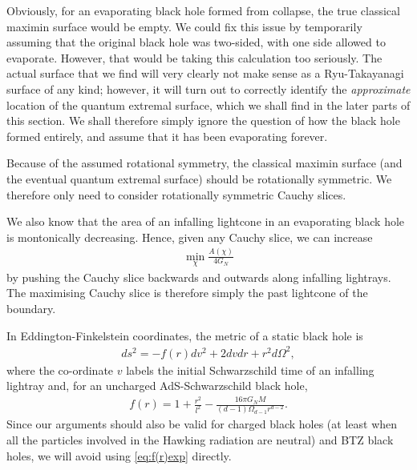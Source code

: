 \documentclass[12pt]{article}
\begin{document}
Obviously, for an evaporating black hole formed from collapse, the true classical maximin surface would be empty. We could fix this issue by temporarily assuming that the original black hole was two-sided, with one side allowed to evaporate. However, that would be taking this calculation too seriously. The actual surface that we find will very clearly not make sense as a Ryu-Takayanagi surface of any kind; however, it will turn out to correctly identify the \emph{approximate} location of the quantum extremal surface, which we shall find in the later parts of this section. We shall therefore simply ignore the question of how the black hole formed entirely, and assume that it has been evaporating forever.

Because of the assumed rotational symmetry, the classical maximin surface (and the eventual quantum extremal surface) should be rotationally symmetric. We therefore only need to consider rotationally symmetric Cauchy slices. 

We also know that the area of an infalling lightcone in an evaporating black hole is montonically decreasing. Hence, given any Cauchy slice, we can increase
\begin{align}
 \min_{\chi} \frac{A(\chi)}{4 G_N} 
\end{align}
by pushing the Cauchy slice backwards and outwards along infalling lightrays. The maximising Cauchy slice is therefore simply the past lightcone of the boundary.

In Eddington-Finkelstein coordinates, the metric of a static black hole is
\begin{align} \label{eq:staticmetric}
ds^2 = -f(r) dv^2 + 2 dv dr + r^2 d\Omega^2,
\end{align}
where the co-ordinate $v$ labels the initial Schwarzschild time of an infalling lightray and, for an uncharged AdS-Schwarzschild black hole, 
\begin{align} \label{eq:f(r)exp}
f(r) = 1 + \frac{r^2}{l^2} - \frac{16 \pi G_N M}{(d-1)\Omega_{d-1} r^{d-2}}.
\end{align}
Since our arguments should also be valid for charged black holes (at least when all the particles involved in the Hawking radiation are neutral) and BTZ black holes, we will avoid using \eqref{eq:f(r)exp} directly. 
\end{document}
